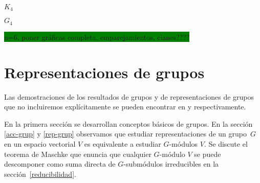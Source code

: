 \documentclass[12pt]{book}
\theoremstyle{definition}
\newcounter{in}
\newcounter{ini}
\begin{document}
\begin{center}
\begin{minipage}{0.26\linewidth}
  \centering
  
  $K_{4}$
\end{minipage}
\begin{minipage}{0.26\linewidth}
  \centering
  
  $G_{4}$
\end{minipage}
\end{center}

{\setlength{\fboxsep}{0pt}\colorbox{green}{n=6, poner gráficas
    completa, emparejamientos, clanes????}}

\chapter{Representaciones de grupos}
\label{Representaciones de grupos}

Las demostraciones de los resultados de grupos y de representaciones
de grupos que no incluiremos explícitamente se pueden encontrar en
\cite{fraleigh} y \cite{liebeck} respectivamente.

En la primera sección se desarrollan conceptos básicos de grupos. En
la sección \ref{acc-grup} y  \ref{rep-grup} observamos que estudiar
representaciones de un grupo~$G$ en un espacio vectorial $V$ es
equivalente a estudiar $G$-módulos $V$. Se discute el teorema de
Maschke que enuncia que cualquier $G$-módulo $V$ se puede descomponer
como suma directa de $G$-submódulos irreducibles en la sección~\ref{reducibilidad}. 
\end{document}
